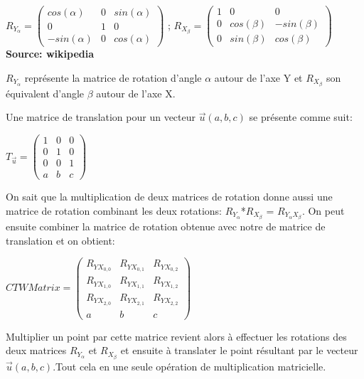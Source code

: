 \documentclass[11pt]{article}
\begin{document}
\begin{center}
	$R_{Y_{\alpha}} =
	\begin{pmatrix}
		cos(\alpha) & 0 & sin(\alpha)\\
		0 & 1 & 0\\
		-sin(\alpha) & 0 & cos(\alpha)
	\end{pmatrix}
	$ ;
	$R_{X_{\beta}} = 
	\begin{pmatrix}
		1 & 0 & 0\\
		0 & cos(\beta) & -sin(\beta)\\
		0 & sin(\beta) & cos(\beta)
	\end{pmatrix}
	$\\
	\textbf{Source: wikipedia} \cite{wikipediaRotationMatrices}
\end{center}
$R_{Y_{\alpha}}$ représente la matrice de rotation d'angle $\alpha$ autour de l'axe Y et $R_{X_{\beta}}$ son équivalent d'angle $\beta$ autour de l'axe X.

Une matrice de translation pour un vecteur $\overrightarrow{u}(a, b, c)$ se présente comme suit:
\begin{center}
	$T_{\overrightarrow{u}} =
	\begin{pmatrix}
		1 & 0 & 0\\
		0 & 1 & 0\\
		0 & 0 & 1\\
		a & b & c
	\end{pmatrix}
	$
\end{center}

On sait que la multiplication de deux matrices de rotation donne aussi une matrice de rotation combinant les deux rotations: $R_{Y_{\alpha}}$*$R_{X_{\beta}}$ = $R_{Y_{\alpha}X_{\beta}}$. On peut ensuite combiner la matrice de rotation obtenue avec notre de matrice de translation et on obtient:
\begin{center}
	$CTWMatrix =
	\begin{pmatrix}
		R_{YX_{0, 0}} & R_{YX_{0, 1}}  & R_{YX_{0, 2}}\\
		R_{YX_{1, 0}} & R_{YX_{1, 1}}  & R_{YX_{1, 2}}\\
		R_{YX_{2, 0}} & R_{YX_{2, 1}}  & R_{YX_{2, 2}}\\
		a & b & c
	\end{pmatrix}
	$
\end{center}

Multiplier un point par cette matrice revient alors à effectuer les rotations des deux matrices $R_{Y_{\alpha}}$ et $R_{X_{\beta}}$ et ensuite à translater le point résultant par le vecteur $\overrightarrow{u}(a, b, c)$.Tout cela en une seule opération de multiplication matricielle.
\end{document}
